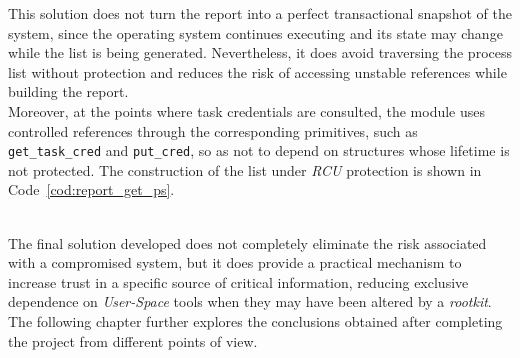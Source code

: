 This solution does not turn the report into a perfect transactional snapshot of the system, since the operating system continues executing and its state may change while the list is being generated.
Nevertheless, it does avoid traversing the process list without protection and reduces the risk of accessing unstable references while building the report.\\

Moreover, at the points where task credentials are consulted, the module uses controlled references through the corresponding primitives, such as \verb|get_task_cred| and \verb|put_cred|, so as not to depend on structures whose lifetime is not protected.
The construction of the list under \textit{RCU} protection is shown in Code~\ref{cod:report_get_ps}.\\\\

\newpage

The final solution developed does not completely eliminate the risk associated with a compromised system, but it does provide a practical mechanism to increase trust in a specific source of critical information, reducing exclusive dependence on \textit{User-Space} tools when they may have been altered by a \textit{rootkit}.
The following chapter further explores the conclusions obtained after completing the project from different points of view.
